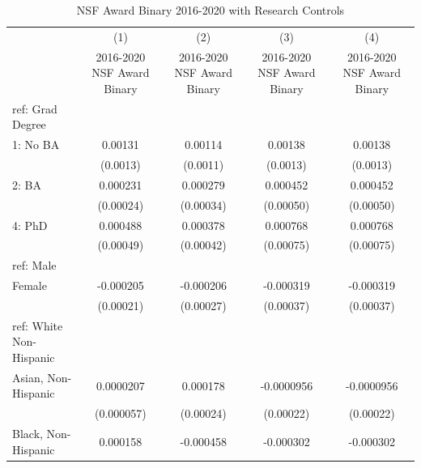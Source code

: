 \begin{table}[htbp]\centering
\def\sym#1{\ifmmode^{#1}\else\(^{#1}\)\fi}
\caption{NSF Award Binary 2016-2020 with Research Controls \label{tab1}}
\begin{tabular}{l*{4}{c}}
\hline\hline
  &\multicolumn{1}{c}{(1)}         &\multicolumn{1}{c}{(2)}         &\multicolumn{1}{c}{(3)}         &\multicolumn{1}{c}{(4)}         \\
  &2016-2020 NSF Award Binary         &2016-2020 NSF Award Binary         &2016-2020 NSF Award Binary         &2016-2020 NSF Award Binary         \\
\hline
ref: Grad Degree&                     &                     &                     &                     \\
[1em]
1: No BA&     0.00131         &     0.00114         &     0.00138         &     0.00138         \\
  &    (0.0013)         &    (0.0011)         &    (0.0013)         &    (0.0013)         \\
[1em]
2: BA&    0.000231         &    0.000279         &    0.000452         &    0.000452         \\
  &   (0.00024)         &   (0.00034)         &   (0.00050)         &   (0.00050)         \\
[1em]
4: PhD&    0.000488         &    0.000378         &    0.000768         &    0.000768         \\
  &   (0.00049)         &   (0.00042)         &   (0.00075)         &   (0.00075)         \\
[1em]
ref: Male&                     &                     &                     &                     \\
[1em]
Female&   -0.000205         &   -0.000206         &   -0.000319         &   -0.000319         \\
  &   (0.00021)         &   (0.00027)         &   (0.00037)         &   (0.00037)         \\
[1em]
ref: White Non-Hispanic&                     &                     &                     &                     \\
[1em]
Asian, Non-Hispanic&   0.0000207         &    0.000178         &  -0.0000956         &  -0.0000956         \\
  &  (0.000057)         &   (0.00024)         &   (0.00022)         &   (0.00022)         \\
[1em]
Black, Non-Hispanic&    0.000158         &   -0.000458         &   -0.000302         &   -0.000302         \\

\end{tabular}
\end{table}

